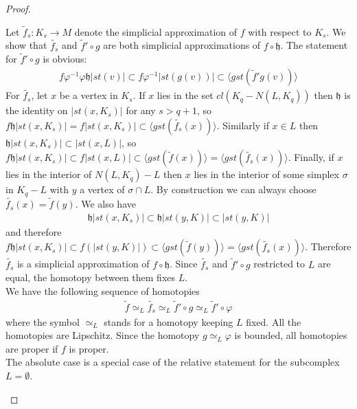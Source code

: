 \documentclass[a4paper,11pt]{article}
\theoremstyle{definition}
\theoremstyle{plain}
\theoremstyle{remark}
\begin{document}
{\begin{proof}
\begin{enumerate}
Let $\tilde{f}_{s}: K_{s}\rightarrow M$ denote the simplicial approximation of $f$ with respect to $K_{s}$. We show that $\tilde{f_{s}}$ and $\tilde{f}' \circ g$ are both simplicial approximations of $f\circ \mathfrak{h}$.  The statement for $\tilde{f}' \circ g$ is obvious:
\begin{align*}
f\varphi^{-1}\varphi\mathfrak{h}|st(v)| \subset f\varphi^{-1} |st(g(v))| \subset  \langle gst(\tilde{f}'g(v))\rangle 
\end{align*}
 For $\tilde{f_{s}}$, let $x$ be a vertex in $K_{s}$. If $x$ lies in the set $cl(K_{q}-N(L,K_{q}))$ then $\mathfrak{h}$ is the identity on $|st(x,K_{s})|$ for any $s>q+1$, so $f\mathfrak{h}|st(x,K_{s})| = f|st(x,K_{s})| \subset \langle gst( \tilde{f_{s}} (x))\rangle$. Similarly if $x\in L$ then $\mathfrak{h}|st(x,K_{s})|\subset |st(x,L)|$, so $f\mathfrak{h}|st(x,K_{s})| \subset f|st(x,L)| \subset \langle gst(\tilde{f}(x))\rangle=\langle gst(\tilde{f_{s}}(x))\rangle$. Finally, if $x$ lies in the interior of  $ N(L,K_{q})- L$ then $x$ lies in the interior of some simplex $\sigma$ in $K_{q}-L$  with $y$ a vertex of $\sigma \cap L$. By construction we can always choose $\tilde{f_{s}}(x) = \tilde{f}(y)$. We also have
\begin{align*}
\mathfrak{h}|st(x,K_{s})| \subset \mathfrak{h}|st(y,K)| \subset |st(y,K)|
\end{align*}
and therefore $f\mathfrak{h}|st(x,K_{s})|\subset f(|st(y,K)|) \subset \langle gst(\tilde{f}(y))\rangle = \langle gst(\tilde{f_{s}}(x))\rangle$. Therefore $\tilde{f_{s}}$ is a simplicial approximation of $f\circ \mathfrak{h}$. Since $\tilde{f_{s}}$ and $\tilde{f}' \circ g$ restricted to $L$ are equal, the homotopy between them fixes $L$. \\

We have the following sequence of homotopies 
\begin{align*}
\tilde{f}\simeq_{L} \tilde{f_{s}} \simeq_{L} \tilde{f}' \circ g \simeq_{L} \tilde{f}'\circ \varphi
\end{align*}
where the symbol $\simeq_{L}$ stands for a homotopy keeping $L$ fixed. All the homotopies are Lipschitz. Since the homotopy $ g \simeq_{L} \varphi$ is bounded, all homotopies are proper if $f$ is proper.\\

The absolute case is a special case of the relative statement for the subcomplex $L=\emptyset$. \\
\end{enumerate} 
\end{proof}

}
\end{document}
